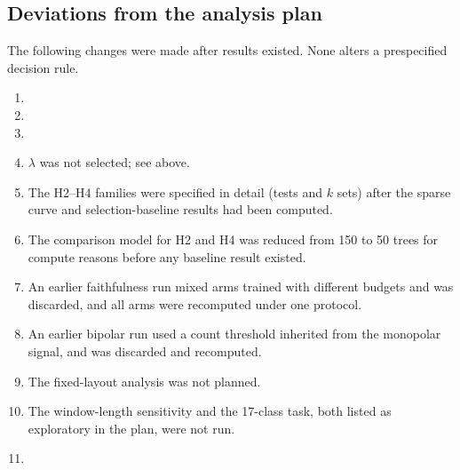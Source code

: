 \subsection{Deviations from the analysis plan}
\label{sec:deviations}
The following changes were made after results existed. None alters a prespecified decision rule.
\begin{enumerate}
\item {}
\item {}
\item {}
\item $\lambda$ was not selected; see above.
\item The H2--H4 families were specified in detail (tests and $k$ sets) after the sparse curve and selection-baseline results had been computed.
\item The comparison model for H2 and H4 was reduced from 150 to 50 trees for compute reasons before any baseline result existed.
\item An earlier faithfulness run mixed arms trained with different budgets and was discarded, and all arms were recomputed under one protocol.
\item An earlier bipolar run used a count threshold inherited from the monopolar signal, and was discarded and recomputed.
\item The fixed-layout analysis was not planned.
\item The window-length sensitivity and the 17-class task, both listed as exploratory in the plan, were not run.
\item {}
\end{enumerate}
